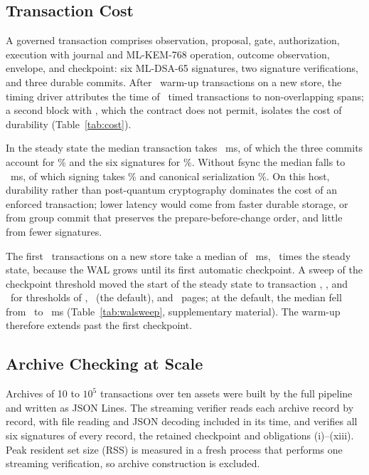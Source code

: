 \subsection{Transaction Cost}
\label{sec:cost}
A governed transaction comprises observation, proposal, gate, authorization, execution with journal and ML-KEM-768 operation, outcome observation, envelope, and checkpoint: six ML-DSA-65 signatures, two signature verifications, and three durable commits. After \TimWarmup\ warm-up transactions on a new store, the timing driver attributes the time of \TimTimed\ timed transactions to non-overlapping spans; a second block with , which the contract does not permit, isolates the cost of durability (Table~\ref{tab:cost}).

In the steady state the median transaction takes \TimDurTotal~ms, of which the three commits account for \TimDurSqlitePct\% and the six signatures for \TimDurSignPct\%. Without fsync the median falls to \TimNoTotal~ms, of which signing takes \TimNoSignPct\% and canonical serialization \TimNoCanonPct\%. On this host, durability rather than post-quantum cryptography dominates the cost of an enforced transaction; lower latency would come from faster durable storage, or from group commit that preserves the prepare-before-change order, and little from fewer signatures.

The first \TimColdStartN\ transactions on a new store take a median of \TimColdStart~ms, \TimColdRatio\ times the steady state, because the WAL grows until its first automatic checkpoint. A sweep of the checkpoint threshold moved the start of the steady state to transaction \WalSteadyA, \WalSteadyB, and \WalSteadyC\ for thresholds of \WalPagesA, \WalPagesB\ (the default), and \WalPagesC\ pages; at the default, the median fell from \WalBeforeB\ to \WalAfterB~ms (Table~\ref{tab:walsweep}, supplementary material). The warm-up therefore extends past the first checkpoint.

\subsection{Archive Checking at Scale}
\label{sec:scale}
Archives of 10 to $10^5$ transactions over ten assets were built by the full pipeline and written as JSON Lines. The streaming verifier reads each archive record by record, with file reading and JSON decoding included in its time, and verifies all six signatures of every record, the retained checkpoint and obligations (i)--(xiii). Peak resident set size (RSS) is measured in a fresh process that performs one streaming verification, so archive construction is excluded.

